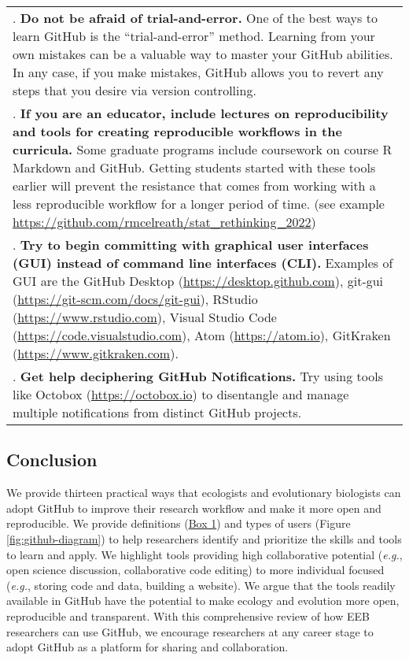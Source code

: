 \begin{tablenos:no-prefix-table-caption}
\begin{longtable}[]{@{}
  >{\raggedright\arraybackslash}p{}@{}}
7. \textbf{Do not be afraid of trial-and-error.} One of the best ways to learn GitHub is the ``trial-and-error'' method. Learning from your own mistakes can be a valuable way to master your GitHub abilities. In any case, if you make mistakes, GitHub allows you to revert any steps that you desire via version controlling. \\
8. \textbf{If you are an educator, include lectures on reproducibility and tools for creating reproducible workflows in the curricula.} Some graduate programs include coursework on course R Markdown and GitHub. Getting students started with these tools earlier will prevent the resistance that comes from working with a less reproducible workflow for a longer period of time. (see example \url{https://github.com/rmcelreath/stat_rethinking_2022}) \\
9. \textbf{Try to begin committing with graphical user interfaces (GUI) instead of command line interfaces (CLI).} Examples of GUI are the GitHub Desktop (\url{https://desktop.github.com}), git-gui (\url{https://git-scm.com/docs/git-gui}), RStudio (\url{https://www.rstudio.com}), Visual Studio Code (\url{https://code.visualstudio.com}), Atom (\url{https://atom.io}), GitKraken (\url{https://www.gitkraken.com}). \\
10. \textbf{Get help deciphering GitHub Notifications.} Try using tools like Octobox (\url{https://octobox.io}) to disentangle and manage multiple notifications from distinct GitHub projects. \\
\bottomrule
\end{longtable}

\end{tablenos:no-prefix-table-caption}

\hypertarget{conclusion}{%
\subsection{Conclusion}\label{conclusion}}

We provide thirteen practical ways that ecologists and evolutionary biologists can adopt GitHub to improve their research workflow and make it more open and reproducible.
We provide definitions (\protect\hyperlink{definitions}{Box 1}) and types of users (Figure \ref{fig:github-diagram}) to help researchers identify and prioritize the skills and tools to learn and apply.
We highlight tools providing high collaborative potential (\emph{e.g.}, open science discussion, collaborative code editing) to more individual focused (\emph{e.g.}, storing code and data, building a website).
We argue that the tools readily available in GitHub have the potential to make ecology and evolution more open, reproducible and transparent.
With this comprehensive review of how EEB researchers can use GitHub, we encourage researchers at any career stage to adopt GitHub as a platform for sharing and collaboration.

